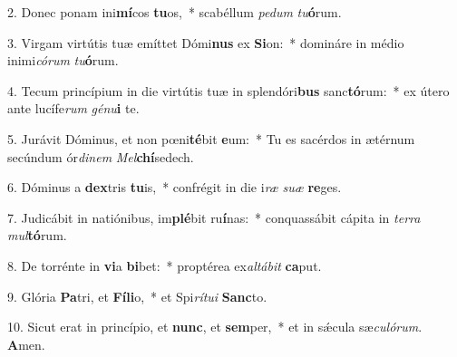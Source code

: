 2. Donec ponam ini\textbf{mí}cos \textbf{tu}os,~*  scabéllum \textit{pe}\textit{dum} \textit{tu}\textbf{ó}rum.\

3. Virgam virtútis tuæ emíttet Dómi\textbf{nus} ex \textbf{Si}on:~*  domináre in médio inimi\textit{có}\textit{rum} \textit{tu}\textbf{ó}rum.\

4. Tecum princípium in die virtútis tuæ in splendóri\textbf{bus} sanc\textbf{tó}rum:~*  ex útero ante lucífe\textit{rum} \textit{gé}\textit{nu}\textbf{i} te.\

5. Jurávit Dóminus, et non pœni\textbf{té}bit \textbf{e}um:~*  Tu es sacérdos in ætérnum secúndum ór\textit{di}\textit{nem} \textit{Mel}\textbf{chí}sedech.\

6. Dóminus a \textbf{dex}tris \textbf{tu}is,~*  confrégit in die i\textit{ræ} \textit{su}\textit{æ} \textbf{re}ges.\

7. Judicábit in natiónibus, im\textbf{plé}bit ru\textbf{í}nas:~*  conquassábit cápita in \textit{ter}\textit{ra} \textit{mul}\textbf{tó}rum.\

8. De torrénte in \textbf{vi}a \textbf{bi}bet:~*  proptérea ex\textit{al}\textit{tá}\textit{bit} \textbf{ca}put.\

9. Glória \textbf{Pa}tri, et \textbf{Fí}\textbf{li}o,~*  et Spi\textit{rí}\textit{tu}\textit{i} \textbf{Sanc}to.\

10. Sicut erat in princípio, et \textbf{nunc}, et \textbf{sem}per,~*  et in sǽcula sæ\textit{cu}\textit{ló}\textit{rum}. \textbf{A}men.\

